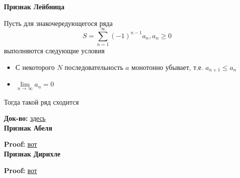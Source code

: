 \documentclass{article}
\begin{document}
	{\bf Признак Лейбница}
	
	Пусть для знакочередующегося ряда $$S = \sum\limits_{n=1}^{\infty}(-1)^{n-1}a_n, a_n \ge 0$$
	выполняются следующие условия
	
	\begin{itemize}
		\item С некоторого $N$ последовательность $a$ монотонно убывает, т.е. $a_{n+1} \le a_n$
		\item $\lim\limits_{n \rightarrow \infty}a_n = 0$
	\end{itemize}
	
	Тогда такой ряд сходится
	
	{\bf Док-во:} \href{https://ru.wikipedia.org/wiki/%D0%A2%D0%B5%D0%BE%D1%80%D0%B5%D0%BC%D0%B0_%D0%9B%D0%B5%D0%B9%D0%B1%D0%BD%D0%B8%D1%86%D0%B0_%D0%BE_%D1%81%D1%85%D0%BE%D0%B4%D0%B8%D0%BC%D0%BE%D1%81%D1%82%D0%B8_%D0%B7%D0%BD%D0%B0%D0%BA%D0%BE%D1%87%D0%B5%D1%80%D0%B5%D0%B4%D1%83%D1%8E%D1%89%D0%B8%D1%85%D1%81%D1%8F_%D1%80%D1%8F%D0%B4%D0%BE%D0%B2}{здесь}\\
	
	{\bf Признак Абеля}
	
	{\bf Proof:} \href{https://ib.mazurok.com/2015/06/16/%D0%BF%D1%80%D0%B8%D0%B7%D0%BD%D0%B0%D0%BA%D0%B8-%D0%B0%D0%B1%D0%B5%D0%BB%D1%8F-%D0%B8-%D0%B4%D0%B8%D1%80%D0%B8%D1%85%D0%BB%D0%B5/}{вот}\\
	
	{\bf Признак Дирихле}
	
	
	{\bf Proof:} \href{https://ib.mazurok.com/2015/06/16/%D0%BF%D1%80%D0%B8%D0%B7%D0%BD%D0%B0%D0%BA%D0%B8-%D0%B0%D0%B1%D0%B5%D0%BB%D1%8F-%D0%B8-%D0%B4%D0%B8%D1%80%D0%B8%D1%85%D0%BB%D0%B5/}{вот}\\
	
\end{document}
